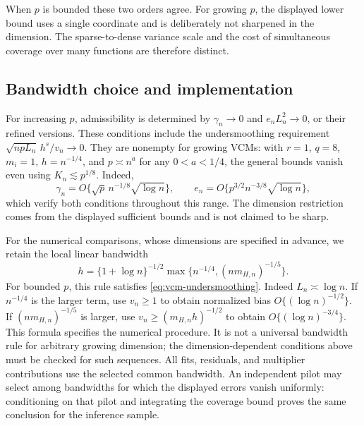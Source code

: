 \documentclass[10pt]{book}
\numberwithin{equation}{section}
\begin{document}
When $p$ is bounded these two orders agree. For growing $p$, the displayed lower bound uses a single coordinate and
is deliberately not sharpened in the dimension. The sparse-to-dense variance scale and the cost of simultaneous
coverage over many functions are therefore distinct.

\subsection{Bandwidth choice and implementation}\label{app:bandwidth-choices}
\label{app:implementation}

For increasing $p$, admissibility is determined by
$\gamma_n\to0$ and $e_nL_n^2\to0$, or their refined versions.
These conditions include the undersmoothing requirement
$\sqrt{npL_n}\,h^s/v_n\to0$.
They are nonempty for growing VCMs: with $r=1$, $q=8$, $m_i=1$,
$h=n^{-1/4}$, and $p\asymp n^a$ for any $0<a<1/4$, the general bounds
vanish even using $K_n\lesssim p^{1/8}$.
Indeed,
\[
\gamma_n=O\{\sqrt p\,n^{-1/8}\sqrt{\log n}\},\qquad
e_n=O\{p^{3/2}n^{-3/8}\sqrt{\log n}\},
\]
which verify both conditions throughout this range.
The dimension restriction comes from the displayed sufficient bounds and
is not claimed to be sharp.

For the numerical comparisons, whose dimensions are specified in advance,
we retain the local linear bandwidth
\begin{equation}
h=\{1+\log n\}^{-1/2}
\max\{n^{-1/4},(nm_{H,n})^{-1/5}\}.
\label{eq:local-linear-phase-bandwidth}
\end{equation}
For bounded $p$, this rule satisfies \eqref{eq:vcm-undersmoothing}.
Indeed $L_n\asymp\log n$. If $n^{-1/4}$ is the larger term, use
$v_n\ge1$ to obtain normalized bias $O\{(\log n)^{-1/2}\}$.
If $(nm_{H,n})^{-1/5}$ is larger, use
$v_n\ge(m_{H,n}h)^{-1/2}$ to obtain $O\{(\log n)^{-3/4}\}$.
This formula specifies the numerical procedure. It is not a universal
bandwidth rule for arbitrary growing dimension; the dimension-dependent
conditions above must be checked for such sequences.
All fits, residuals, and multiplier contributions use the selected common
bandwidth. An independent pilot may select among bandwidths for which the
displayed errors vanish uniformly: conditioning on that pilot and
integrating the coverage bound proves the same conclusion for the
inference sample.
\end{document}
